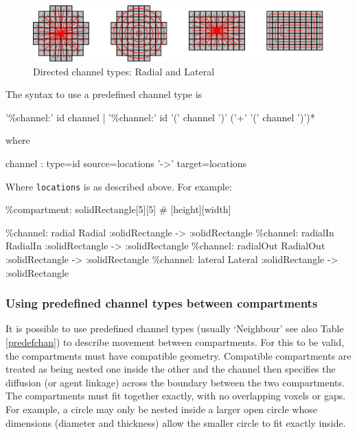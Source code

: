 \documentclass[english]{report}
\begin{document}
\medskip 

\begin{figure}[h!]
 \centering
 \includegraphics[scale=0.27]{./images/directedChannelTypes.png}
 \caption{Directed channel types: Radial and Lateral}
 \label{fig:directedChannelTypes}
\end{figure}

The syntax to use a predefined channel type is

\begin{bnfsource}
'\%channel:' id channel
| '\%channel:' id '(' channel ')' ('+' '(' channel ')')*
\end{bnfsource}
where
\begin{bnfsource}
channel :
  type=id source=locations '->' target=locations
\end{bnfsource}
Where \verb|locations| is as described above. For example:
\begin{kappasource}
\%compartment: solidRectangle[5][5] # [height][width]

\%channel: radial Radial :solidRectangle -> :solidRectangle
\%channel: radialIn RadialIn :solidRectangle -> :solidRectangle
\%channel: radialOut RadialOut :solidRectangle -> :solidRectangle
\%channel: lateral Lateral :solidRectangle -> :solidRectangle
\end{kappasource}

\subsubsection{Using predefined channel types between compartments}

It is possible to use predefined channel types (usually `Neighbour' see also Table \ref{predefchan}) to describe movement between compartments. For this to be valid, the compartments must have compatible geometry. Compatible compartments are treated as being nested one inside the other and the channel then specifies the diffusion (or agent linkage) across the boundary between the two compartments. The compartments must fit together exactly, with no overlapping voxels or gaps. For example, a circle may only be nested inside a larger open circle whose dimensions (diameter and thickness) allow the smaller circle to fit exactly inside.
\end{document}

